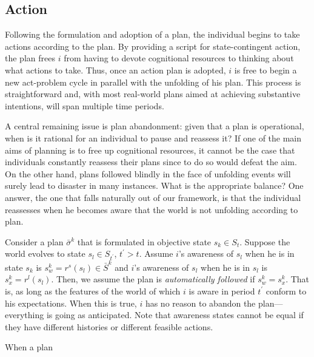 \documentclass[
11pt,
titlepage,
reqno,
]{article}%
\theoremstyle{definition}
\begin{document}
\subsection{Action}

Following the formulation and adoption of a plan, the individual begins to take actions according to the plan.
By providing a script for state-contingent action, the plan frees $i$ from having to devote cognitional resources to thinking about what actions to take.
Thus, once an action plan is adopted, $i$ is free to begin a new act-problem cycle in parallel with the unfolding of his plan.
This process is straightforward and, with most real-world plans aimed at achieving substantive intentions, will span multiple time periods.

A central remaining issue is plan abandonment: given that a plan is operational, when is it rational for an individual to pause and reassess it? 
If one of the main aims of planning is to free up cognitional resources, it  cannot be the case that individuals constantly reassess their plans since to do so would defeat the aim.
On the other hand, plans followed blindly in the face of unfolding events will surely lead to disaster in many instances.
What is the appropriate balance?
One answer, the one that falls naturally out of our framework, is that the individual reassesses when he becomes aware that the world is not unfolding according to plan.

Consider a plan $\bar{\sigma}^{k}$  that is formulated in objective state $s_k\in S_t$.
Suppose the world evolves to state $s_l\in S_{t^\prime}$, $t^\prime>t$.
Assume $i$'s awareness of $s_l$ when he is in state $s_k$ is $s^k_w=r^s(s_l)\in  \bar{S}^k$ and $i$'s awareness of $s_l$ when he is in  $s_l$ is $s^k_x=r^l(s_l)$.
Then, we assume the plan is \textit{automatically followed}  if $s^k_w=s^k_x$.
That is, as long as the features of the world of which $i$ is aware in period $t^\prime$ conform to his expectations.
When this is true, $i$ has no reason to abandon the plan---everything is going as anticipated.
Note that awareness states cannot be equal if they have different histories or different feasible actions.	

When a plan 
\end{document}
